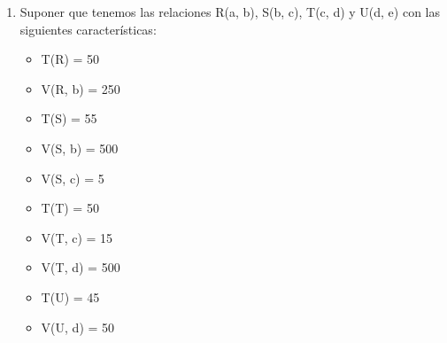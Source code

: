 \documentclass{templateNote}
\newcommand{\newparagraph}{\par\vspace{\baselineskip}\noindent}
\begin{document}
\begin{enumerate}
    \newpage
    \item Suponer que tenemos las relaciones R(a, b), S(b, c), T(c, d) y U(d, e) con las siguientes características:
    \newparagraph
    \begin{minipage}{0.5\textwidth}
        \begin{itemize}
            \item T(R) = 50
            \item V(R, b) = 250
            \item T(S) = 55
            \item V(S, b) = 500
            \item V(S, c) = 5
        \end{itemize}
    \end{minipage}
    \hfill
    \begin{minipage}{0.5\textwidth}
        \begin{itemize}
            \item T(T) = 50
            \item V(T, c) = 15
            \item V(T, d) = 500
            \item T(U) = 45
            \item V(U, d) = 50
        \end{itemize}
    \end{minipage}
\end{enumerate}
\end{document}

